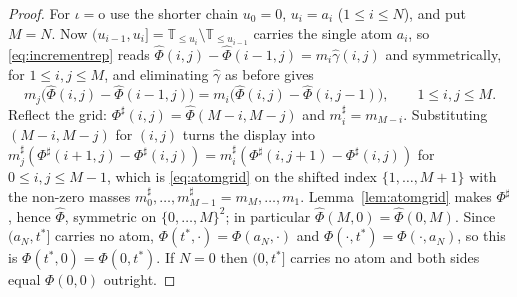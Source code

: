 \documentclass[11pt,a4paper]{article}
\theoremstyle{plain}
\theoremstyle{definition}
\theoremstyle{remark}
\newcommand{\T}{\mathbb{T}}                     %
\begin{document}
\begin{proof}
  For $\iota = \mathrm{o}$ use the shorter chain $u_0 = 0$, $u_i = a_i$
  ($1 \leq i \leq N$), and put $M = N$.  Now $(u_{i-1},u_i] = \T_{\leq u_i}
  \setminus \T_{\leq u_{i-1}}$ carries the single atom $a_i$, so
  \eqref{eq:incrementrep} reads
  $\widehat\Phi(i,j) - \widehat\Phi(i{-}1,j) = m_i \widehat\gamma(i,j)$ and
  symmetrically, for $1 \leq i,j \leq M$, and eliminating $\widehat\gamma$ as
  before gives
  \[
    m_j \bigl( \widehat\Phi(i,j) - \widehat\Phi(i{-}1,j) \bigr)
      = m_i \bigl( \widehat\Phi(i,j) - \widehat\Phi(i,j{-}1) \bigr) ,
    \qquad 1 \leq i,j \leq M .
  \]
  Reflect the grid: $\Phi^{\sharp}(i,j) = \widehat\Phi(M{-}i,M{-}j)$ and
  $m^{\sharp}_i = m_{M-i}$.  Substituting $(M{-}i,M{-}j)$ for $(i,j)$ turns the
  display into $m^{\sharp}_j(\Phi^{\sharp}(i{+}1,j) - \Phi^{\sharp}(i,j)) =
  m^{\sharp}_i(\Phi^{\sharp}(i,j{+}1) - \Phi^{\sharp}(i,j))$ for
  $0 \leq i,j \leq M-1$, which is \eqref{eq:atomgrid} on the shifted index
  $\{1,\dots,M{+}1\}$ with the non-zero masses
  $m^{\sharp}_0,\dots,m^{\sharp}_{M-1} = m_M,\dots,m_1$.  Lemma~\ref{lem:atomgrid}
  makes $\Phi^{\sharp}$, hence $\widehat\Phi$, symmetric on $\{0,\dots,M\}^2$; in
  particular $\widehat\Phi(M,0) = \widehat\Phi(0,M)$.  Since $(a_N,t^*]$ carries
  no atom, $\Phi(t^*,\cdot) = \Phi(a_N,\cdot)$ and $\Phi(\cdot,t^*) =
  \Phi(\cdot,a_N)$, so this is $\Phi(t^*,0) = \Phi(0,t^*)$.  If $N = 0$ then
  $(0,t^*]$ carries no atom and both sides equal $\Phi(0,0)$ outright.
\end{proof}
\end{document}

